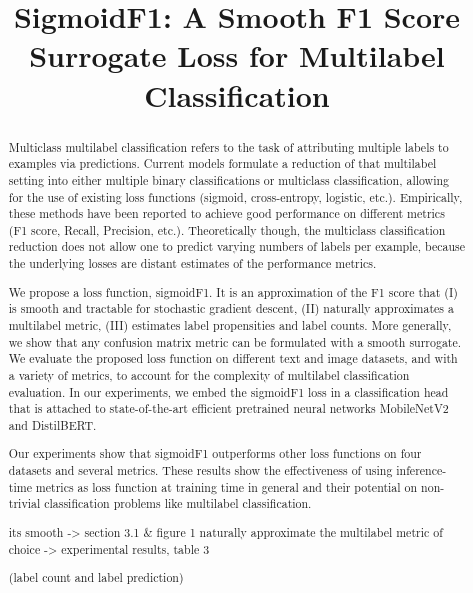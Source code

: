 \documentclass[sigconf,natbib,screen=true,review=true,anonymous]{acmart}
\begin{document}
\title[SigmoidF1: A Smooth F1 Score Surrogate Loss for Multilabel Classification]{SigmoidF1: A Smooth F1 Score Surrogate Loss for Multilabel Classification}


\begin{abstract}

  Multiclass multilabel classification refers to the task of attributing multiple labels to examples via predictions. Current models formulate a reduction of that multilabel setting into either multiple binary classifications or multiclass classification, allowing for the use of existing loss functions (sigmoid, cross-entropy, logistic, etc.). Empirically, these methods have been reported to achieve good performance on different metrics (F1 score, Recall, Precision, etc.). Theoretically though, the multiclass classification reduction does not allow one to predict varying numbers of labels per example, because the underlying losses are distant estimates of the performance metrics.

  We propose a loss function, sigmoidF1. It is an approximation of the F1 score that (I) is smooth and tractable for stochastic gradient descent, (II) naturally approximates a multilabel metric, (III) estimates label propensities and label counts. More generally, we show that any confusion matrix metric can be formulated with a smooth surrogate. We evaluate the proposed loss function on different text and image datasets, and with a variety of metrics, to account for the complexity of multilabel classification evaluation. In our experiments, we embed the sigmoidF1 loss in a classification head that is attached to state-of-the-art efficient pretrained neural networks MobileNetV2 and DistilBERT.

Our experiments show that sigmoidF1 outperforms other loss functions on four datasets and several metrics. These results show the effectiveness of using inference-time metrics as loss function at training time in general and their potential on non-trivial classification problems like multilabel classification.

its smooth -> section 3.1 & figure 1
naturally approximate the multilabel metric of choice -> experimental results, table 3

(label count and label prediction)


\end{abstract}
\end{document}

